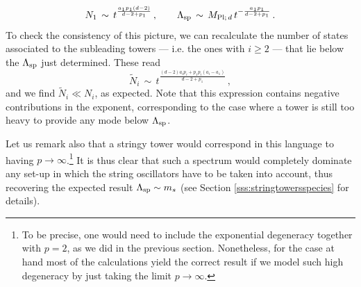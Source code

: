 %
\begin{equation}\label{eq:speciesadditive}
		N_1\, \sim\, t^{\frac{a_1 p_1(d-2)}{ d-2+p_1}}\, , \qquad  \Lambda_{\text{sp}}\, \sim\, M_{\text{Pl;}\, d}\, t^{-\frac{ a_1 p_1}{d-2+ p_1}}\, .
\end{equation}
%
To check the consistency of this picture, we can recalculate the number of states associated to the subleading towers --- i.e. the ones with $i\geq 2$ --- that lie below the $\Lambda_{\text{sp}}$ just determined. These read
%
\begin{equation}
		\tilde{N}_i\, \sim\, t^{\frac{(d-2) a_i p_i+ p_1 p_i (a_i - a_1)}{d-2+p_1}}\, ,
\end{equation}
%
and we find $\tilde{N}_i \ll N_i$, as expected. Note that this expression contains negative contributions in the exponent, corresponding to the case where a tower is still too heavy to provide any mode below $\Lambda_{\text{sp}}$.%
	
Let us remark also that a stringy tower would correspond in this language to having $p \to \infty$.\footnote{To be precise, one would need to include the exponential degeneracy together with $p=2$, as we did in the previous section. Nonetheless, for the case at hand most of the calculations yield the correct result if we model such high degeneracy by just taking the limit $p \to \infty$. } It is thus clear that such a spectrum would completely dominate any set-up in which the string oscillators have to be taken into account, thus recovering the expected result $\Lambda_{\text{sp}} \sim m_s$ (see Section \ref{sss:stringtowersspecies} for details).
	
	
